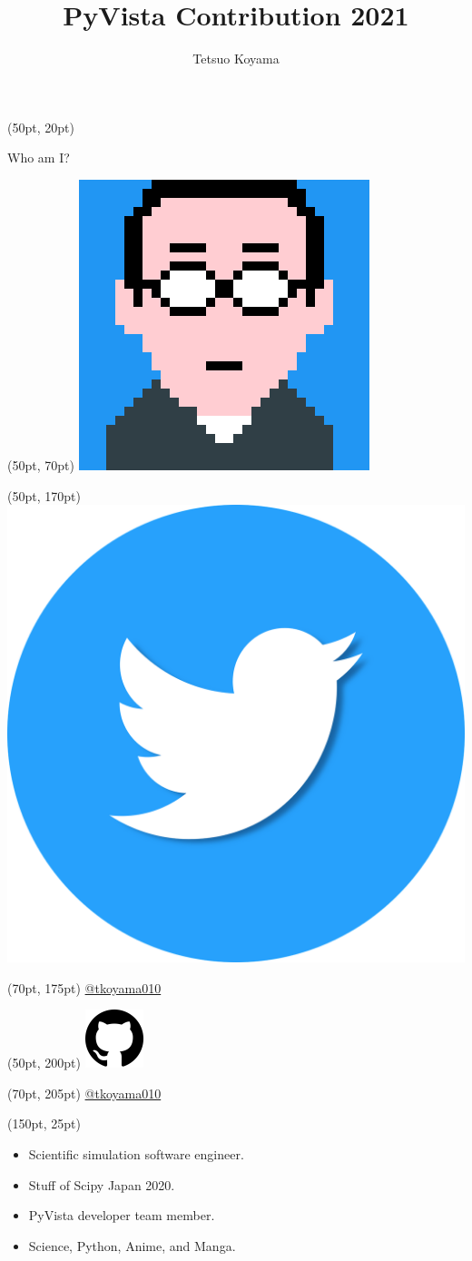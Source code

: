 \documentclass[aspectratio=169,12pt]{beamer}
\title{PyVista Contribution 2021}
\begin{document}
\author{Tetsuo Koyama}

\frame{\titlepage}

\begin{frame}[fragile]
\begin{textblock*}{350pt}(50pt, 20pt)
\begin{block}{Who am I?}
\end{block}
\end{textblock*}
\begin{textblock*}{350pt}(50pt, 70pt)
\includegraphics[width=0.25\linewidth]{tkoyama010.png}
\end{textblock*}
\begin{textblock*}{350pt}(50pt, 170pt)
\includegraphics[width=0.05\linewidth]{twitter-5662063_1280.png}
\end{textblock*}
\begin{textblock*}{350pt}(70pt, 175pt)
\href{https://twitter.com/tkoyama010}{@tkoyama010}
\end{textblock*}
\begin{textblock*}{350pt}(50pt, 200pt)
\includegraphics[width=0.05\linewidth]{github.png}
\end{textblock*}
\begin{textblock*}{350pt}(70pt, 205pt)
\href{https://github.com/tkoyama010}{@tkoyama010}
\end{textblock*}
\begin{textblock*}{350pt}(150pt, 25pt)
\begin{itemize}
\item Scientific simulation software engineer.
\item Stuff of Scipy Japan 2020.
\item PyVista developer team member.
\item Science, Python, Anime, and Manga.
\end{itemize}
\end{textblock*}
\end{frame}
\end{document}
